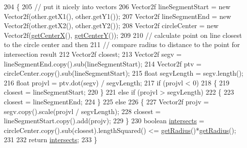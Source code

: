 \begin{DoxyCode}
204                                            \{ 
205         \textcolor{comment}{// put it nicely into vectors }
206         Vector2f lineSegmentStart = \textcolor{keyword}{new} Vector2f(other.getX1(), other.getY1()); 
207         Vector2f lineSegmentEnd = \textcolor{keyword}{new} Vector2f(other.getX2(), other.getY2()); 
208         Vector2f circleCenter = \textcolor{keyword}{new} Vector2f(\mbox{\hyperlink{classorg_1_1newdawn_1_1slick_1_1geom_1_1_circle_a54401470f8ee5f99c2013ca06e7cb057}{getCenterX}}(), \mbox{\hyperlink{classorg_1_1newdawn_1_1slick_1_1geom_1_1_circle_a3e64722eb886a7936ce75199e94e1e48}{getCenterY}}()); 
209 
210         \textcolor{comment}{// calculate point on line closest to the circle center and then }
211         \textcolor{comment}{// compare radius to distance to the point for intersection result }
212         Vector2f closest; 
213         Vector2f segv = lineSegmentEnd.copy().sub(lineSegmentStart); 
214         Vector2f ptv = circleCenter.copy().sub(lineSegmentStart); 
215         \textcolor{keywordtype}{float} segvLength = segv.length(); 
216         \textcolor{keywordtype}{float} projvl = ptv.dot(segv) / segvLength; 
217         \textcolor{keywordflow}{if} (projvl < 0) 
218         \{ 
219             closest = lineSegmentStart; 
220         \} 
221         \textcolor{keywordflow}{else} \textcolor{keywordflow}{if} (projvl > segvLength) 
222         \{ 
223             closest = lineSegmentEnd; 
224         \} 
225         \textcolor{keywordflow}{else} 
226         \{ 
227             Vector2f projv = segv.copy().scale(projvl / segvLength); 
228             closest = lineSegmentStart.copy().add(projv); 
229         \} 
230         \textcolor{keywordtype}{boolean} \mbox{\hyperlink{classorg_1_1newdawn_1_1slick_1_1geom_1_1_circle_a43871352a37b105ea470981d89a178cc}{intersects}} = circleCenter.copy().sub(closest).lengthSquared() <= 
      \mbox{\hyperlink{classorg_1_1newdawn_1_1slick_1_1geom_1_1_circle_a3d83f7477c608a767ced2622440a528a}{getRadius}}()*\mbox{\hyperlink{classorg_1_1newdawn_1_1slick_1_1geom_1_1_circle_a3d83f7477c608a767ced2622440a528a}{getRadius}}(); 
231         
232         \textcolor{keywordflow}{return} \mbox{\hyperlink{classorg_1_1newdawn_1_1slick_1_1geom_1_1_circle_a43871352a37b105ea470981d89a178cc}{intersects}}; 
233     \} 
\end{DoxyCode}
\mbox{\label{classorg_1_1newdawn_1_1slick_1_1geom_1_1_circle_aa62c5ac4b04e9a252a0d462724231d98}} 

